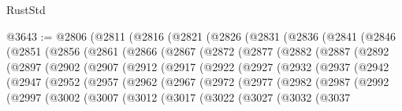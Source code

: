 \begin{lexlean}{RustStd}
\begin{coremodule}
{\begin{coremodule}
{{{{{{{{{{{{{{{{{{{{{{{{{{{{{{{{{{{{{{{{{{{{{{{{{{{{{{{{{{{{{{{{{{{{@3643 := @2806
    (@2811
      (@2816
        (@2821
          (@2826
            (@2831
              (@2836
                (@2841
                  (@2846
                    (@2851
                      (@2856
                        (@2861
                          (@2866
                            (@2867
                              (@2872
                                (@2877
                                  (@2882
                                    (@2887
                                      (@2892
                                        (@2897
                                          (@2902
                                            (@2907
                                              (@2912
                                                (@2917
                                                  (@2922
                                                    (@2927
                                                      (@2932
                                                        (@2937
                                                          (@2942
                                                            (@2947
                                                              (@2952
                                                                (@2957
                                                                  (@2962
                                                                    (@2967
                                                                      (@2972
                                                                        (@2977
                                                                          (@2982
                                                                            (@2987
                                                                              (@2992
                                                                                (@2997
                                                                                  (@3002
                                                                                    (@3007
                                                                                      (@3012
                                                                                        (@3017
                                                                                          (@3022
                                                                                            (@3027
                                                                                              (@3032
                                                                                                (@3037
}}}}}}}}}}}}}}}}}}}}}}}}}}}}}}}}}}}}}}}}}}}}}}}}}}}}}}}}}}}}}}}}}}}}
\end{coremodule}}
\end{coremodule}
\end{lexlean}
